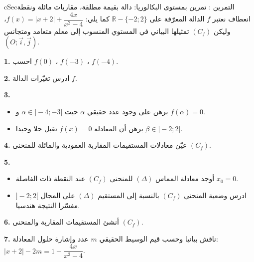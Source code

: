 \documentclass[12pt,a4paper]{article}
\newenvironment{BOX}[2]{\begin{otherlanguage}{english}\begin{arbox}{#1}{#2}}{\end{arbox}\end{otherlanguage}}
\newcounter{exo}
\newenvironment{tamrin}[1]{\stepcounter{exo}\begin{BOX}{cSec}{التمرين \theexo: #1}}{\end{BOX}}
\newcommand{\R}{\mathbb{R}}
\newenvironment{sq}{\begin{itemize}[leftmargin=2.4em,itemsep=3pt]}{\end{itemize}}
\newcommand{\qa}{\item[(أ)]}\newcommand{\qb}{\item[(ب)]}\newcommand{\qc}{\item[(جـ)]}\newcommand{\qd}{\item[(د)]}\newcommand{\qe}{\item[(هـ)]}
\newcommand{\QQ}[1]{\par\smallskip\textbf{#1.} }
\begin{document}
\begin{tamrin}{تمرين بمستوى البكالوريا: دالة بقيمة مطلقة، مقاربات مائلة ونقطة انعطاف}
نعتبر $f$ الدالة المعرّفة على $\R-\{-2;2\}$ كما يلي: $f(x)=|x+2|+\dfrac{4x}{x^{2}-4}$، وليكن $(C_f)$ تمثيلها البياني في المستوي المنسوب إلى معلم متعامد ومتجانس $(O;\vec i,\vec j)$.
\QQ{1} احسب $f(0)$ ، $f(-3)$ ، $f(-4)$.
\QQ{2} ادرس تغيّرات الدالة $f$.
\QQ{3}
\begin{sq}
\qa برهن على وجود عدد حقيقي $\alpha$ حيث $\alpha\in]-4;-3[$ و $f(\alpha)=0$.
\qb برهن أن المعادلة $f(x)=0$ تقبل حلا وحيدا $\beta\in]-2;2[$.
\end{sq}
\QQ{4} عيّن معادلات المستقيمات المقاربة العمودية والمائلة للمنحنى $(C_f)$.
\QQ{5}
\begin{sq}
\qa أوجد معادلة المماس $(\Delta)$ للمنحنى $(C_f)$ عند النقطة ذات الفاصلة $x_0=0$.
\qb ادرس وضعية المنحنى $(C_f)$ بالنسبة إلى المستقيم $(\Delta)$ على المجال $]-2;2[$ مفسّرا النتيجة هندسيا.
\end{sq}
\QQ{6} أنشئ المستقيمات المقاربة والمنحنى $(C_f)$.
\QQ{7} ناقش بيانيا وحسب قيم الوسيط الحقيقي $m$ عدد وإشارة حلول المعادلة: \ $|x+2|-2m=1-\dfrac{4x}{x^{2}-4}$.
\end{tamrin}
\end{document}
